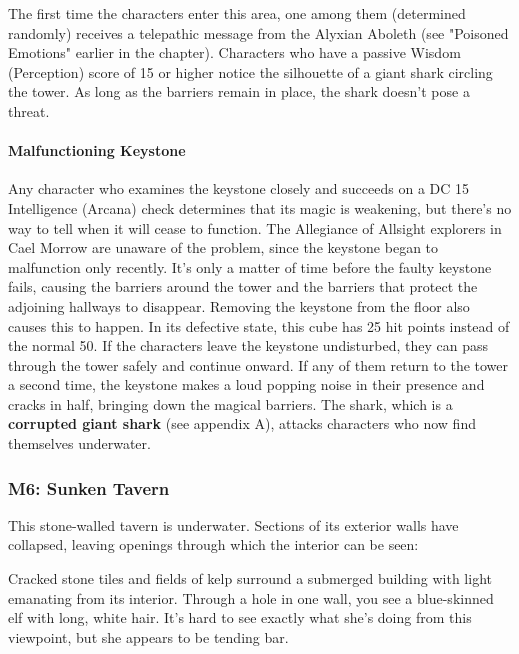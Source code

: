 \documentclass[10pt,a4,twoside,twocolumn,openany,nodeprecatedcode]{dndbook}
\begin{document}
The first time the characters enter this area, one among them (determined randomly) receives a telepathic message from the Alyxian Aboleth (see "Poisoned Emotions" earlier in the chapter).
Characters who have a passive Wisdom (Perception) score of 15 or higher notice the silhouette of a giant shark circling the tower. As long as the barriers remain in place, the shark doesn't pose a threat.
\paragraph{Malfunctioning Keystone}
Any character who examines the keystone closely and succeeds on a DC 15 Intelligence (Arcana) check determines that its magic is weakening, but there's no way to tell when it will cease to function. The Allegiance of Allsight explorers in Cael Morrow are unaware of the problem, since the keystone began to malfunction only recently.
It's only a matter of time before the faulty keystone fails, causing the barriers around the tower and the barriers that protect the adjoining hallways to disappear. Removing the keystone from the floor also causes this to happen. In its defective state, this cube has 25 hit points instead of the normal 50.
If the characters leave the keystone undisturbed, they can pass through the tower safely and continue onward. If any of them return to the tower a second time, the keystone makes a loud popping noise in their presence and cracks in half, bringing down the magical barriers. The shark, which is a \textbf{corrupted giant shark} (see appendix A), attacks characters who now find themselves underwater.
\subsubsection{M6: Sunken Tavern}
This stone-walled tavern is underwater. Sections of its exterior walls have collapsed, leaving openings through which the interior can be seen:
\begin{DndReadAloud}{}
Cracked stone tiles and fields of kelp surround a submerged building with light emanating from its interior. Through a hole in one wall, you see a blue-skinned elf with long, white hair. It's hard to see exactly what she's doing from this viewpoint, but she appears to be tending bar.
\end{DndReadAloud}
\end{document}
